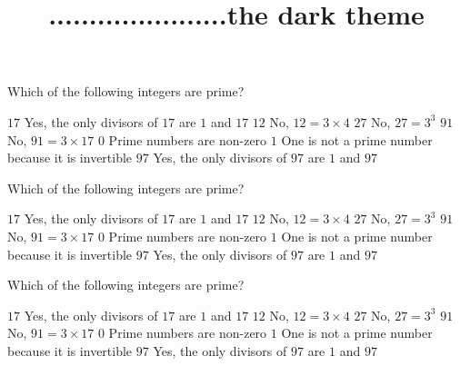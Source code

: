 \documentclass[theme=dark]{webquiz}
\title{......................the dark theme}
\begin{document}
  \begin{question}     %
     Which of the following integers are prime?
     \begin{choice}[multiple, columns=3]
       \correct   $17$ \feedback Yes, the only divisors of $17$ are $1$ and $17$
       \incorrect $12$ \feedback No, $12 = 3\times 4$
       \incorrect $27$ \feedback No, $27=3^3$
       \incorrect $91$ \feedback No, $91 = 3\times 17$
       \incorrect  $0$ \feedback Prime numbers are non-zero
       \incorrect  $1$ \feedback One is not a prime number because it is invertible
       \correct   $97$ \feedback Yes, the only divisors of $97$ are $1$ and $97$
     \end{choice}
  \end{question}

  \begin{question}     %
     Which of the following integers are prime?
     \begin{choice}[multiple, columns=3]
       \correct   $17$ \feedback Yes, the only divisors of $17$ are $1$ and $17$
       \incorrect $12$ \feedback No, $12 = 3\times 4$
       \incorrect $27$ \feedback No, $27=3^3$
       \incorrect $91$ \feedback No, $91 = 3\times 17$
       \incorrect  $0$ \feedback Prime numbers are non-zero
       \incorrect  $1$ \feedback One is not a prime number because it is invertible
       \correct   $97$ \feedback Yes, the only divisors of $97$ are $1$ and $97$
     \end{choice}
  \end{question}

  \begin{question}     %
     Which of the following integers are prime?
     \begin{choice}[multiple, columns=3]
       \correct   $17$ \feedback Yes, the only divisors of $17$ are $1$ and $17$
       \incorrect $12$ \feedback No, $12 = 3\times 4$
       \incorrect $27$ \feedback No, $27=3^3$
       \incorrect $91$ \feedback No, $91 = 3\times 17$
       \incorrect  $0$ \feedback Prime numbers are non-zero
       \incorrect  $1$ \feedback One is not a prime number because it is invertible
       \correct   $97$ \feedback Yes, the only divisors of $97$ are $1$ and $97$
     \end{choice}
  \end{question}
\end{document}
